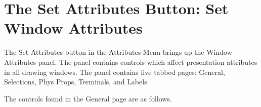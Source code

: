 \section{The {\cb Set Attributes} Button: Set Window Attributes}
The {\cb Set Attributes} button in the {\cb Attributes Menu} brings up
the {\cb Window Attributes} panel.  The panel contains controls which
affect presentation attributes in all drawing windows.  The panel
contains five tabbed pages:  {\cb General}, {\cb Selections}, {\cb
Phys Props}, {\cb Terminals}, and {\cb Labels}

The controls found in the {\cb General} page are as follows.

